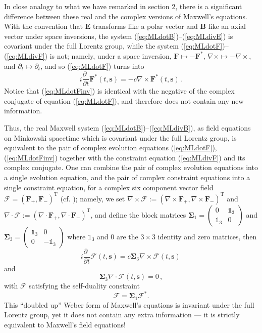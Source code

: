\documentclass[12pt]{article}
\theoremstyle{definition}
\newcommand{\pddt}{\frac{\partial\phantom{t}}{\partial t}}
\newcommand{\refeq}[1]{(\ref{#1})}
\newcommand{\vect}[1] {\boldsymbol{{ #1}} }
\newcommand{\sV}{{\vect{s}}}            %
\newcommand{\FV}{\pmb{\mathcal{F}}}
\numberwithin{equation}{section}
\newcommand{\bB}{\mathbf{B}}
\newcommand{\bE}{\mathbf{E}}
\newcommand{\bF}{\mathbf{F}}
\newcommand{\beq}{\begin{equation}}
\newcommand{\eeq}{\end{equation}}
\newcommand{\p}{\partial}
\newcommand{\nab}{\nabla}
\begin{document}
 In close analogy to what we have remarked in section 2, there is a significant difference between these real and the
complex versions of Maxwell's equations. 
 With the convention that $\bE$ transforms like a polar vector and $\bB$ like an axial vector under space inversions, 
the system \refeq{eq:MLdotB}--\refeq{eq:MLdivE} is covariant under the full Lorentz group, while the system 
\refeq{eq:MLdotF}--\refeq{eq:MLdivF} is not; namely, under a space inversion,
$\bF\mapsto -\bF^\ast$, $\nab\times \mapsto -\nab\times$, and $\p_t\mapsto\p_t$, and so \refeq{eq:MLdotF} turns into 
\begin{equation}
 i \textstyle{\pddt}{\bF}^\ast(t,\sV)
= \label{eq:MLdotFinv}
       -  c\nab\times{\bF}^\ast(t,\sV) \, .
\end{equation}
 Notice that \refeq{eq:MLdotFinv} is identical with the negative of the complex conjugate of equation \refeq{eq:MLdotF}, and
therefore does not contain any new information.

 Thus, the real Maxwell system \refeq{eq:MLdotB}--\refeq{eq:MLdivB}, as field equations on Minkowski spacetime
which is covariant under the full Lorentz group, is equivalent to the pair of complex evolution equations 
\refeq{eq:MLdotF}, \refeq{eq:MLdotFinv} together with the constraint equation \refeq{eq:MLdivF} and its complex conjugate. 
 One can combine the pair of complex evolution equations into a single evolution equation,
and the pair of complex constraint equations into a single constraint equation, for a complex six component vector field
$\FV  = (\bF_+ ,\bF_-)^{\mathrm{T}}$ (cf. \cite{IBBphotonREV}); namely, we set $\nab\times\FV  := (\nab\times\bF_+ ,\nab\times\bF_-)^{\mathrm{T}}$ and 
$\nab\cdot\FV  := (\nab\cdot\bF_+ ,\nab\cdot\bF_-)^{\mathrm{T}}$, and define the block matrices
${\boldsymbol\Sigma}_1 = \begin{pmatrix} 0 & \mathds{1}_3 \\ \mathds{1}_3 & 0 \end{pmatrix}$ and 
${\boldsymbol\Sigma}_3 = \begin{pmatrix} \mathds{1}_3 & 0 \\ 0 & -\mathds{1}_3 \end{pmatrix}$ 
where $\mathds{1}_3$ and $0$ are the $3\times 3$ identity and zero matrices, then 
\begin{equation}
 i \textstyle{\pddt}{\FV}(t,\sV)
= \label{eq:MLdotFFstar}
         c {\boldsymbol\Sigma}_3 \nab\times{\FV}(t,\sV) \, 
\end{equation}
and
\begin{equation}
\textstyle
        {\boldsymbol\Sigma}_3 \nab\cdot {\FV}(t,\sV)  
= \label{eq:MLdivFFstar}
        0\, ,
\end{equation}
with $\FV$ satisfying the self-duality constraint
\beq 
\FV = {\boldsymbol\Sigma}_1 \FV^\ast.
\eeq
 This ``doubled up'' Weber form of Maxwell's equations is invariant under the full Lorentz group, yet
it does not contain any extra information --- it is strictly equivalent to Maxwell's field equations!
\end{document}
